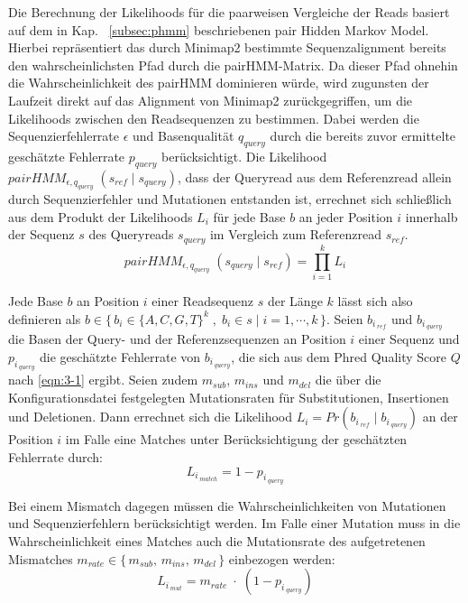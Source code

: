 Die Berechnung der Likelihoods für die paarweisen Vergleiche der Reads basiert auf dem in Kap. ~\ref{subsec:phmm} beschriebenen pair Hidden Markov Model. Hierbei repräsentiert das durch Minimap2 bestimmte Sequenzalignment bereits den wahrscheinlichsten Pfad durch die pairHMM-Matrix. Da dieser Pfad ohnehin die Wahrscheinlichkeit des pairHMM dominieren würde, wird zugunsten der Laufzeit direkt auf das Alignment von Minimap2 zurückgegriffen, um die Likelihoods zwischen den Readsequenzen zu bestimmen. Dabei werden die Sequenzierfehlerrate $ \epsilon $ und Basenqualität $ q_{query} $ durch die bereits zuvor ermittelte geschätzte Fehlerrate $ p_{query} $ berücksichtigt. Die Likelihood $ pairHMM_{\epsilon, q_{query}} \;(s_{ref}\;|\; s_{query}) $, dass der Queryread aus dem Referenzread allein durch Sequenzierfehler und Mutationen entstanden ist, errechnet sich schließlich aus dem Produkt der Likelihoods $ L_{i} $ für jede Base $ b $ an jeder Position $ i $ innerhalb der Sequenz $ s $ des Queryreads $ s_{query} $ im Vergleich zum Referenzread $ s_{ref} $.
\begin{equation} \label{eqn:3-2}
\tag{3-2}
pairHMM_{\epsilon, q_{query}} \;(s_{query}\;|\; s_{ref}) = \prod_{i=1}^{k}L_{i}
\end{equation}

Jede Base $ b $ an Position $ i $ einer Readsequenz $ s $ der Länge $ k $ lässt sich also definieren als $ b \in \{\,b_{i}\in \{A,C,G,T\}^k\;,\; b_{i} \in s \;|\; i = 1, \dotsb, k \,\}$. Seien $ b_{i\,_{ref}} $ und $ b_{i\,_{query}} $ die Basen der Query- und der Referenzsequenzen an Position $ i $ einer Sequenz und $  p_{i\,_{query}} $ die geschätzte Fehlerrate von $ b_{i\,_{query}} $, die sich aus dem Phred Quality Score $ Q $ nach  \eqref{eqn:3-1} ergibt. Seien zudem $ m_{sub} $, $ m_{ins} $ und $ m_{del} $ die über die Konfigurationsdatei festgelegten Mutationsraten für Substitutionen, Insertionen und Deletionen. Dann errechnet sich die Likelihood $ L_{i} = Pr(b_{i\,_{ref}}\;|\; b_{i\,_{query}})$ an der Position $ i $ im Falle eine Matches unter Berücksichtigung der geschätzten Fehlerrate durch:
\begin{equation} \label{eqn:3-3}
\tag{3-3}
L_{i\,_{match}} = 1 - p_{i\,_{query}}
\end{equation}

Bei einem Mismatch dagegen müssen die Wahrscheinlichkeiten von Mutationen und Sequenzierfehlern berücksichtigt werden. Im Falle einer Mutation muss in die Wahrscheinlichkeit eines Matches auch die Mutationsrate des aufgetretenen Mismatches $ m_{rate} \in \{\,m_{sub},\,  m_{ins},\, m_{del}\,\} $ einbezogen werden:
\begin{equation} \label{eqn:3-4}
\tag{3-4}
L_{i\,_{mut}} = m_{rate}\; \cdotp \;(1 - p_{i\,_{query}})
\end{equation}

